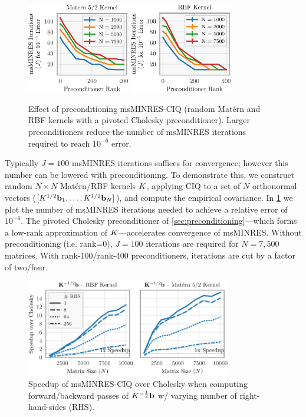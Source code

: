 \begin{figure}[t!]
	\centering
	\includegraphics[width=0.4\textwidth]{figures/precond_result.pdf}
  \quad
	\includegraphics[width=0.4\textwidth]{figures/precond_result_rbf.pdf}
  \caption[
    Effect of preconditioning msMINRES-CIQ.
  ]{
    Effect of preconditioning msMINRES-CIQ (random Mat\'ern and RBF kernels with a pivoted Cholesky preconditioner).
    Larger preconditioners reduce the number of msMINRES iterations required to reach $10^{-6}$ error.
  }
  \label{fig:precond_result}
\end{figure}

Typically $J=100$ msMINRES iterations suffices for convergence; however this number can be lowered with preconditioning.
To demonstrate this, we construct  random $N \times N$ Mat\'ern/RBF kernels $K$, applying CIQ to a set of $N$ orthonormal vectors ($[K^{1/2} \mathbf{b}_{1}, \ldots, K^{1/2} \mathbf{b}_{N}]$), and compute the empirical covariance.
In \cref{fig:precond_result} we plot the number of msMINRES iterations needed to achieve a relative error of $10^{-6}$.
The pivoted Cholesky preconditioner of \cref{sec:preconditioning}---which forms a low-rank approximation of $K$---accelerates convergence of msMINRES.
Without preconditioning (i.e. rank=0), $J=100$ iterations are required for $N=7,\!500$ matrices.
With rank-100/rank-400 preconditioners, iterations are cut by a factor of two/four.

\begin{figure}[t!]
	\centering
	\includegraphics[width=0.8\textwidth]{figures/timing.pdf}
  \caption[
    Speedup of msMINRES-CIQ over Cholesky.
  ]{
    Speedup of msMINRES-CIQ over Cholesky when computing forward/backward passes of $K^{-\frac 1 2} \mathbf{b}$ w/ varying number of right-hand-sides (RHS).
  }
  \label{fig:timing}
\end{figure}

